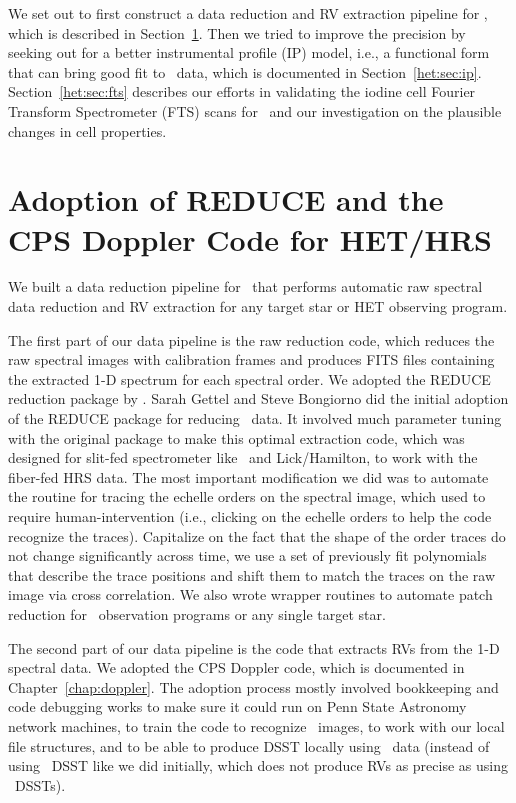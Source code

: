 We set out to first construct a data reduction and RV extraction
pipeline for \het, which is described in
Section~\ref{het:sec:pipeline}. Then we tried to improve the precision
by seeking out for a better instrumental profile (IP) model, i.e., a
functional form that can bring good fit to \het\ data, which is
documented in Section~\ref{het:sec:ip}. Section~\ref{het:sec:fts}
describes our efforts in validating the iodine cell Fourier Transform
Spectrometer (FTS) scans for \het\ and our investigation on the
plausible changes in cell properties.


\section{Adoption of REDUCE and the CPS Doppler Code for
  HET/HRS}\label{het:sec:pipeline} 

We built a data reduction pipeline for \het\ that performs automatic
raw spectral data reduction and RV extraction for any target star or
HET observing program.

The first part of our data pipeline is the raw reduction code, which
reduces the raw spectral images with calibration frames and produces
FITS files containing the extracted 1-D spectrum for each spectral
order.  We adopted the REDUCE reduction package by
\cite{2002A&A...385.1095P}. Sarah Gettel and Steve Bongiorno did the
initial adoption of the REDUCE package for reducing \het\ data. It
involved much parameter tuning with the original package to make this
optimal extraction code, which was designed for slit-fed spectrometer
like \keck\ and Lick/Hamilton, to work with the fiber-fed HRS data.
The most important modification we did was to automate the routine for
tracing the echelle orders on the spectral image, which used to
require human-intervention (i.e., clicking on the echelle orders to
help the code recognize the traces). Capitalize on the fact that the
shape of the order traces do not change significantly across time, we
use a set of previously fit polynomials that describe the trace
positions and shift them to match the traces on the raw image via
cross correlation. We also wrote wrapper routines to automate patch
reduction for \het\ observation programs or any single target star.

The second part of our data pipeline is the code that extracts RVs
from the 1-D spectral data. We adopted the CPS Doppler code, which is
documented in Chapter~\ref{chap:doppler}. The adoption process mostly
involved bookkeeping and code debugging works to make sure it could
run on Penn State Astronomy network machines, to train
the code to recognize \het\ images, to work with our local file
structures, and to be able to produce DSST locally using \het\ data
(instead of using \keck\ DSST like we did initially, which does not
produce RVs as precise as using \het\ DSSTs). 

